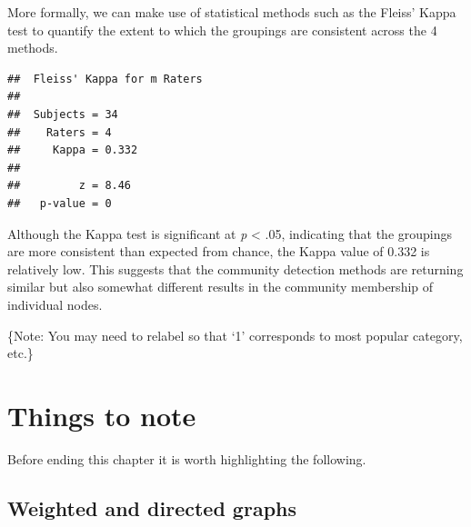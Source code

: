 \documentclass[
]{book}
\newenvironment{Shaded}{\begin{snugshade}}{\end{snugshade}}
\newcommand{\AttributeTok}[1]{\textcolor[rgb]{0.13,0.29,0.53}{#1}}
\newcommand{\CommentTok}[1]{\textcolor[rgb]{0.56,0.35,0.01}{\textit{#1}}}
\newcommand{\FunctionTok}[1]{\textcolor[rgb]{0.13,0.29,0.53}{\textbf{#1}}}
\newcommand{\NormalTok}[1]{#1}
\newcommand{\OtherTok}[1]{\textcolor[rgb]{0.56,0.35,0.01}{#1}}
\newcommand{\SpecialCharTok}[1]{\textcolor[rgb]{0.81,0.36,0.00}{\textbf{#1}}}
\begin{document}
More formally, we can make use of statistical methods such as the Fleiss' Kappa test to quantify the extent to which the groupings are consistent across the 4 methods.

\begin{Shaded}
\end{Shaded}

\begin{verbatim}
##  Fleiss' Kappa for m Raters
## 
##  Subjects = 34 
##    Raters = 4 
##     Kappa = 0.332 
## 
##         z = 8.46 
##   p-value = 0
\end{verbatim}

Although the Kappa test is significant at \emph{p} \textless{} .05, indicating that the groupings are more consistent than expected from chance, the Kappa value of 0.332 is relatively low. This suggests that the community detection methods are returning similar but also somewhat different results in the community membership of individual nodes.

\{Note: You may need to relabel so that `1' corresponds to most popular category, etc.\}

\section{Things to note}\label{things-to-note}

Before ending this chapter it is worth highlighting the following.

\subsection{Weighted and directed graphs}\label{weighted-and-directed-graphs}
\end{document}
